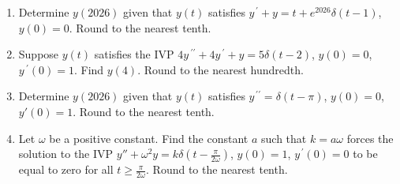 \documentclass{ximera}
\begin{document}
\begin{enumerate}[label=(\arabic*)]








\item Determine $y(2026)$ given that $y(t)$ satisfies $y^{\,\prime}+y=t+e^{2026}\delta (t-1)$, $y(0)=0$.  Round to the nearest tenth.









\item Suppose $y(t)$ satisfies the IVP $4y\,^{\prime\prime}+4y\,^{\prime}+y=5\delta (t-2)$, $y(0)=0$, $y\,^{\prime}(0)=1$.  Find $y(4)$.  Round to the nearest hundredth.







\item Determine $y(2026)$ given that $y(t)$ satisfies $y^{\,\prime\prime}=\delta (t-\pi)$, $y(0)=0$, $y'(0)=1$.  Round to the nearest tenth.



\item Let $\omega$ be a positive constant.   Find the constant $a$ such that $k=a\omega$ forces the solution to the IVP $y''+\omega^2 y=k\delta \left(t-\frac{\pi}{2\omega}\right)$, $y(0)=1$, $y^{\,\prime}(0)=0$ to be equal to zero for all $t\geq \frac{\pi}{2\omega}$.  Round to the nearest tenth. 


\end{enumerate}
\end{document}
